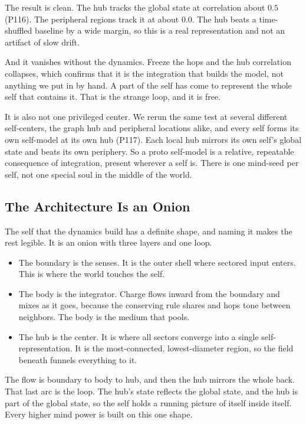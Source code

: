 The result is clean. The hub tracks the global state at correlation about $0.5$ (P116). The peripheral regions track it at about $0.0$. The hub beats a time-shuffled baseline by a wide margin, so this is a real representation and not an artifact of slow drift.

And it vanishes without the dynamics. Freeze the hops and the hub correlation collapses, which confirms that it is the integration that builds the model, not anything we put in by hand. A part of the self has come to represent the whole self that contains it. That is the strange loop, and it is free.

It is also not one privileged center. We rerun the same test at several different self-centers, the graph hub and peripheral locations alike, and every self forms its own self-model at its own hub (P117). Each local hub mirrors its own self's global state and beats its own periphery. So a proto self-model is a relative, repeatable consequence of integration, present wherever a self is. There is one mind-seed per self, not one special soul in the middle of the world.

\subsection{The Architecture Is an Onion}

The self that the dynamics build has a definite shape, and naming it makes the rest legible. It is an onion with three layers and one loop.

\begin{itemize}
\item The boundary is the senses. It is the outer shell where sectored input enters. This is where the world touches the self.
\item The body is the integrator. Charge flows inward from the boundary and mixes as it goes, because the conserving rule shares and hops tone between neighbors. The body is the medium that pools.
\item The hub is the center. It is where all sectors converge into a single self-representation. It is the most-connected, lowest-diameter region, so the field beneath funnels everything to it.
\end{itemize}

The flow is boundary to body to hub, and then the hub mirrors the whole back. That last arc is the loop. The hub's state reflects the global state, and the hub is part of the global state, so the self holds a running picture of itself inside itself. Every higher mind power is built on this one shape.

